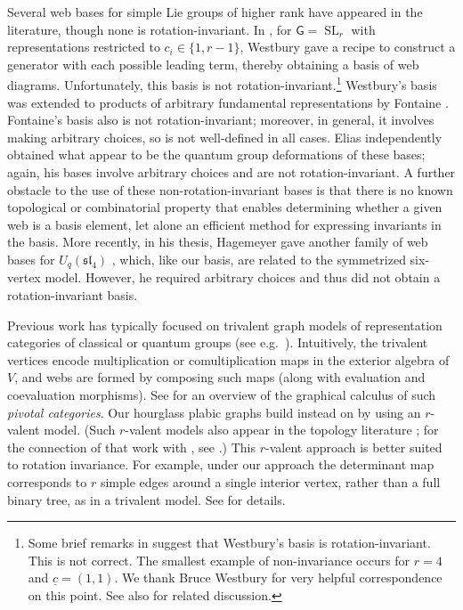 \documentclass{amsart}
\theoremstyle{definition}
\theoremstyle{remark}
\numberwithin{equation}{section}
\DeclareMathOperator{\SL}{SL}
\newcommand{\fsl}{\mathfrak{sl}}
\begin{document}
Several web bases for simple Lie groups of higher rank have appeared in the literature, though none is rotation-invariant. In \cite{Westbury}, for $\mathsf{G} = \SL_r$ with representations restricted to $c_i \in \{1, r-1\}$, Westbury gave a recipe to construct a generator with each possible leading term, thereby obtaining a basis of web diagrams. Unfortunately, this basis is not rotation-invariant.\footnote{Some brief remarks in \cite[p.~94]{Westbury} suggest that Westbury's basis is rotation-invariant. This is not correct. The smallest example of non-invariance occurs for $r=4$ and $\underline{c} = (1,1)$. We thank Bruce Westbury for very helpful correspondence on this point. See also \cite[p.~6121]{Fraser-Lam-Le} for related discussion.} Westbury's basis was extended to products of arbitrary fundamental representations by Fontaine \cite{Fontaine}. Fontaine's basis also is not rotation-invariant; moreover, in general, it involves making arbitrary choices, so is not well-defined in all cases. Elias \cite{Elias} independently obtained what appear to be the quantum group deformations of these bases; again, his bases involve arbitrary choices and are not rotation-invariant. A further obstacle to the use of these non-rotation-invariant bases is that there is no known topological or combinatorial property that enables determining whether a given web is a basis element, let alone an efficient method for expressing invariants in the basis. More recently, in his thesis, Hagemeyer gave another family of web bases for $U_q(\fsl_4)$ \cite[Thm.~1.8]{Hagemeyer}, which, like our basis, are related to the symmetrized six-vertex model. However, he required arbitrary choices and thus did not obtain a rotation-invariant basis.

Previous work has typically focused on trivalent graph models of representation categories of classical or quantum groups (see e.g.~\cite{MOY,Khovanov-Kuperberg,Kim,Morrison,Cautis-Kamnitzer-Morrison}). Intuitively, the trivalent vertices encode multiplication or comultiplication maps in the exterior algebra of $V$, and webs are formed by composing such maps (along with evaluation and coevaluation morphisms). See \cite{Selinger} for an overview of the graphical calculus of such \emph{pivotal categories}. Our hourglass plabic graphs build instead on \cite{Fraser-Lam-Le} by using an $r$-valent model. (Such $r$-valent models also appear in the topology literature \cite{Sikora,Le.Sikora}; for the connection of that work with \cite{Cautis-Kamnitzer-Morrison}, see \cite{Poudel}.) This $r$-valent approach is better suited to rotation invariance. For example, under our approach the determinant map corresponds to $r$ simple edges around a single interior vertex, rather than a full binary tree, as in a trivalent model. See  for details.
\end{document}
